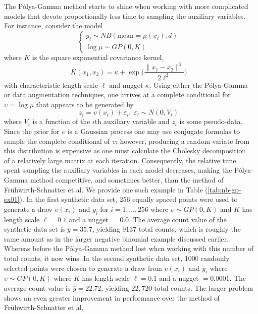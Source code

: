 \documentclass[11pt]{article}
\newcommand{\ep}{\varepsilon}
\newcommand{\Polya}{P\'{o}lya}
\begin{document}
The \Polya-Gamma method starts to shine when working with more complicated
models that devote proportionally less time to sampling the auxiliary variables.
For instance, consider the model
\[
\begin{cases}
y_i \sim NB(\text{mean} = \mu(x_i), d) \\
\log \mu  \sim GP(0, K)
\end{cases}
\]
where $K$ is the square exponential covariance kernel,
\[
K(x_1,x_2) = \kappa + \exp \Big( \frac{\|x_1 - x_2\|^2}{2 \ell^2} \Big)
\]
with characteristic length scale $\ell$ and nugget $\kappa$.  Using either the
\Polya-Gamma or \cite{fruhwirth-schnatter-etal-2009} data augmentation
techniques, one arrives at a complete conditional for $\upsilon = \log \mu$ that
appears to be generated by
\[
z_i = \upsilon(x_i) + \ep_i, \; \ep_i \sim N(0, V_i)
\]
where $V_i$ is a function of the $i$th auxiliary variable and $z_i$ is some
pseudo-data.  Since the prior for $\upsilon$ is a Gaussian process one may use
conjugate formulas to sample the complete conditional of $\upsilon$; however,
producing a random variate from this distribution is expensive as one must
calculate the Cholesky decomposition of a relatively large matrix at each
iteration.  Consequently, the relative time spent sampling the auxiliary
variables in each model decreases, making the \Polya-Gamma method competitive,
and sometimes better, than the method of Fr\"{u}hwirth-Schnatter et al.  We
provide one such example in Table (\ref{tab:nb-gp-ex01}).  In the first
synthetic data set, 256 equally spaced points were used to generate a draw
$\upsilon(x_i)$ and $y_i$ for $i=1, \ldots, 256$ where $\upsilon \sim GP(0, K)$
and $K$ has length scale $\ell = 0.1$ and a nugget $=0.0$.  The average count
value of the synthetic data set is $\bar y = 35.7$, yielding 9137 total counts,
which is roughly the same amount as in the larger negative binomial example
discussed earlier.  Whereas before the \Polya-Gamma method lost when working
with this number of total counts, it now wins.  In the second synthetic data
set, 1000 randomly selected points were chosen to generate a draw from
$\upsilon(x_i)$ and $y_i$ where $\upsilon \sim GP(0, K)$ where $K$ has length
scale $\ell = 0.1$ and a nugget $=0.0001$.  The average count value is $\bar y =
22.72$, yielding $22,720$ total counts.  The larger problem shows an even
greater improvement in performance over the method of Fr\"{u}hwirth-Schnatter et
al.
\end{document}
